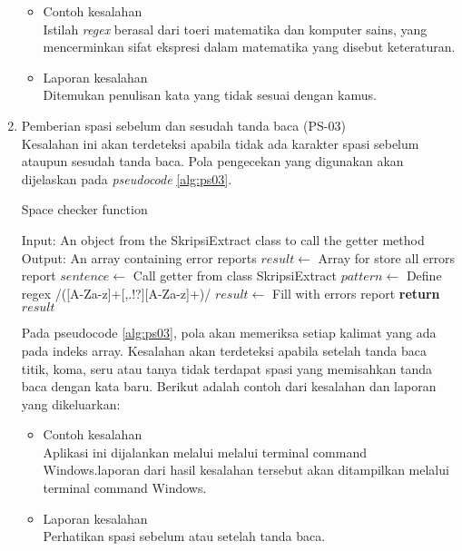 \begin{enumerate}
	\begin{itemize}
		\item Contoh kesalahan \\
		Istilah \textit{regex} berasal dari toeri matematika dan komputer sains, yang mencerminkan sifat ekspresi dalam matematika yang disebut keteraturan.
		\item Laporan kesalahan \\
		Ditemukan penulisan kata yang tidak sesuai dengan kamus.
	\end{itemize}
	
	\item Pemberian spasi sebelum dan sesudah tanda baca (PS-03) \\
	Kesalahan ini akan terdeteksi apabila tidak ada karakter spasi sebelum ataupun sesudah tanda baca. Pola pengecekan yang digunakan akan dijelaskan pada \textit{pseudocode} \ref{alg:ps03}.
	
\begin{minipage}{1.0\linewidth}
\begin{algorithm}[H]
    \caption{Space checker function}
	\label{alg:ps03}
	\begin{algorithmic}[1]
    		\State Input: An object from the SkripsiExtract class to call the getter method
			\State Output: An array containing error reports
			\State $result \gets$ Array for store all errors report
			\State $sentence \gets$ Call getter from class SkripsiExtract
				\State $pattern \gets$ Define regex /([A-Za-z]+[,.!?][A-Za-z]+)/
                	\State $result \gets$ Fill with errors report
            	\EndIf
        	\EndFor
    		\State \textbf{return} $result$
    	\EndFunction
	\end{algorithmic}
\end{algorithm}
\end{minipage}
\medskip
	
	Pada pseudocode \ref{alg:ps03}, pola akan memeriksa setiap kalimat yang ada pada indeks array. Kesalahan akan terdeteksi apabila setelah tanda baca titik, koma, seru atau tanya tidak terdapat spasi yang memisahkan tanda baca dengan kata baru. Berikut adalah contoh dari kesalahan dan laporan yang dikeluarkan:
	
	\begin{itemize}
		\item Contoh kesalahan \\
		Aplikasi ini dijalankan melalui melalui terminal command Windows.laporan dari hasil kesalahan tersebut akan ditampilkan melalui terminal command Windows.
		\item Laporan kesalahan \\
		Perhatikan spasi sebelum atau setelah tanda baca.
	\end{itemize}
	

\end{enumerate}
